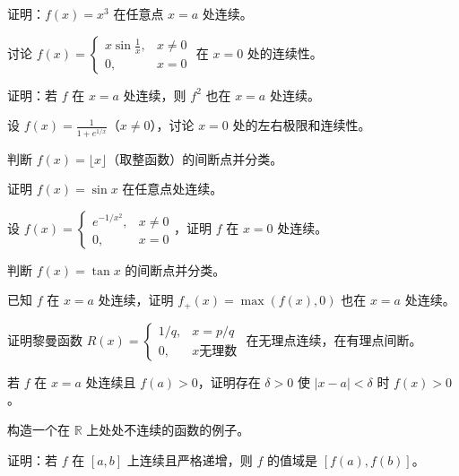 \begin{exercise}[4]
证明：\(f(x)=x^3\) 在任意点 \(x=a\) 处连续。
\end{exercise}
\begin{exercise}[4]
讨论 \(f(x)=\begin{cases}x\sin\frac1x,&x\neq0\\0,&x=0\end{cases}\) 在 \(x=0\) 处的连续性。
\end{exercise}
\begin{exercise}[4]
证明：若 \(f\) 在 \(x=a\) 处连续，则 \(f^2\) 也在 \(x=a\) 处连续。
\end{exercise}
\begin{exercise}[4]
设 \(f(x)=\frac{1}{1+e^{1/x}}\)（\(x\neq0\)），讨论 \(x=0\) 处的左右极限和连续性。
\end{exercise}
\begin{exercise}[4]
判断 \(f(x)=\lfloor x\rfloor\)（取整函数）的间断点并分类。
\end{exercise}

\begin{exercise}[5]
证明 \(f(x)=\sin x\) 在任意点处连续。
\end{exercise}
\begin{exercise}[5]
设 \(f(x)=\begin{cases}e^{-1/x^2},&x\neq0\\0,&x=0\end{cases}\)，证明 \(f\) 在 \(x=0\) 处连续。
\end{exercise}
\begin{exercise}[5]
判断 \(f(x)=\tan x\) 的间断点并分类。
\end{exercise}
\begin{exercise}[5]
已知 \(f\) 在 \(x=a\) 处连续，证明 \(f_+(x)=\max(f(x),0)\) 也在 \(x=a\) 处连续。
\end{exercise}

\begin{exercise}[6]
证明黎曼函数 \(R(x)=\begin{cases}1/q,&x=p/q\\0,&x\text{无理数}\end{cases}\) 在无理点连续，在有理点间断。
\end{exercise}
\begin{exercise}[6]
若 \(f\) 在 \(x=a\) 处连续且 \(f(a)>0\)，证明存在 \(\delta>0\) 使 \(|x-a|<\delta\) 时 \(f(x)>0\)。
\end{exercise}
\begin{exercise}[6]
构造一个在 \(\mathbb{R}\) 上处处不连续的函数的例子。
\end{exercise}

\begin{exercise}[7]
证明：若 \(f\) 在 \([a,b]\) 上连续且严格递增，则 \(f\) 的值域是 \([f(a),f(b)]\)。
\end{exercise}

